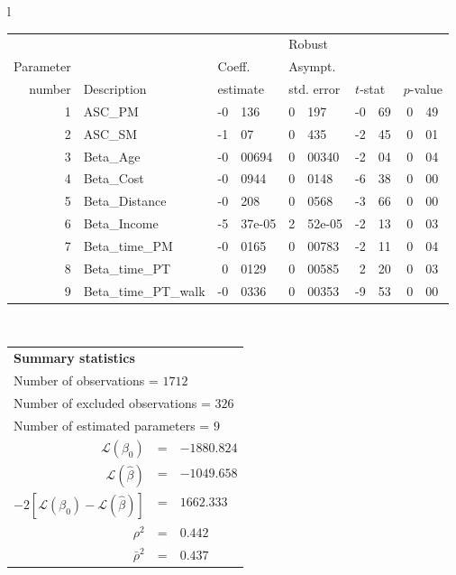   \begin{tabular}{l}
\begin{tabular}{rlr@{.}lr@{.}lr@{.}lr@{.}l}
         &                       &   \multicolumn{2}{l}{}    & \multicolumn{2}{l}{Robust}  &     \multicolumn{4}{l}{}   \\
Parameter &                       &   \multicolumn{2}{l}{Coeff.}      & \multicolumn{2}{l}{Asympt.}  &     \multicolumn{4}{l}{}   \\
number &  Description                     &   \multicolumn{2}{l}{estimate}      & \multicolumn{2}{l}{std. error}  &   \multicolumn{2}{l}{$t$-stat}  &   \multicolumn{2}{l}{$p$-value}   \\

\hline

1 & ASC_PM  & -0&136 & 0&197 & -0&69 & 0&49\\
2 & ASC_SM & -1&07 & 0&435 & -2&45 & 0&01\\
3 & Beta_Age & -0&00694 & 0&00340 & -2&04 & 0&04\\
4 & Beta_Cost & -0&0944 & 0&0148 & -6&38 & 0&00\\
5 & Beta_Distance & -0&208 & 0&0568 & -3&66 & 0&00\\
6 & Beta_Income & -5&37e-05 & 2&52e-05 & -2&13 & 0&03\\
7 & Beta_time_PM & -0&0165 & 0&00783 & -2&11 & 0&04\\
8 & Beta_time_PT & 0&0129 & 0&00585 & 2&20 & 0&03\\
9 & Beta_time_PT_walk & -0&0336 & 0&00353 & -9&53 & 0&00\\
\hline
\end{tabular}
\\
\begin{tabular}{rcl}
\multicolumn{3}{l}{\bf Summary statistics}\\
\multicolumn{3}{l}{ Number of observations = $1712$} \\
\multicolumn{3}{l}{ Number of excluded observations = $326$} \\
\multicolumn{3}{l}{ Number of estimated  parameters = $9$} \\
 $\mathcal{L}(\beta_0)$ &=&  $-1880.824$ \\
 $\mathcal{L}(\hat{\beta})$ &=& $-1049.658 $  \\
 $-2[\mathcal{L}(\beta_0) -\mathcal{L}(\hat{\beta})]$ &=& $1662.333$ \\
    $\rho^2$ &=&   $0.442$ \\
    $\bar{\rho}^2$ &=&    $0.437$ \\
\end{tabular}
  \end{tabular}
